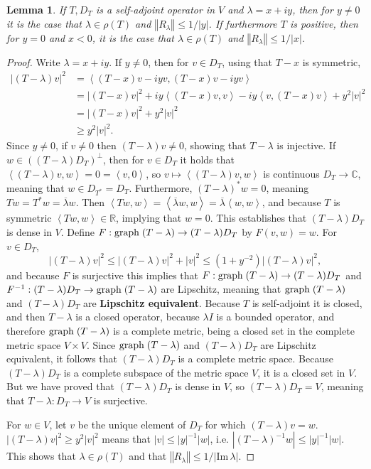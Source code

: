 \documentclass{article}
\newcommand{\inner}[2]{\left\langle #1, #2 \right\rangle}
\def\Im{\ensuremath{\mathrm{Im}}\,}
\newcommand{\graph}{\ensuremath\mathrm{graph}\;}
\newcommand{\norm}[1]{\left\Vert #1 \right\Vert}
\newtheorem{lemma}[theorem]{Lemma}
\theoremstyle{definition}
\begin{document}
\begin{lemma}
If $T,D_T$ is a  self-adjoint operator in $V$ and $\lambda=x+iy$, then
for $y \neq 0$ it is the case that
$\lambda \in \rho(T)$ and $\norm{R_\lambda} \leq 1/|y|$.
If furthermore $T$ is positive, then for $y=0$ and $x<0$, it is the case that
$\lambda \in \rho(T)$ and
 $\norm{R_\lambda} \leq 
1/|x|$.
\end{lemma}
\begin{proof}
Write $\lambda = x+iy$. If $y \neq 0$, then for $v \in D_T$, using that $T-x$ is symmetric,
\begin{align*}
|(T-\lambda)v|^2&=\inner{(T-x)v-iyv}{(T-x)v-iyv}\\
&=|(T-x)v|^2 +iy \inner{(T-x)v}{v} -iy \inner{v}{(T-x)v}+y^2 |v|^2\\
&=|(T-x)v|^2 +y^2 |v|^2\\
&\geq y^2 |v|^2.
\end{align*}
Since $y \neq 0$, if $v \neq 0$ then $(T-\lambda)v \neq 0$, showing that $T-\lambda$ is injective.
If $w \in ((T-\lambda)D_T)^\perp$, then
for $v \in D_T$ it holds that $\inner{(T-\lambda)v}{w}=0=\inner{v}{0}$, so
$v \mapsto \inner{(T-\lambda)v}{w}$ is continuous $D_T \to \mathbb{C}$, meaning
that $w \in D_{T^*}=D_T$. 
Furthermore, $(T-\lambda)^*w = 0$, meaning $Tw = T^*w = \overline{\lambda} w$.  
Then $\inner{Tw}{w} = \inner{\overline{\lambda}w}{w} = \overline{\lambda} \inner{w}{w}$,
and because $T$ is symmetric $\inner{Tw}{w} \in \mathbb{R}$, implying that $w=0$.
This establishes that $(T-\lambda)D_T$ is dense in $V$.
Define $F:\graph (T-\lambda) \to (T-\lambda)D_T$ by $F(v,w)=w$.
For $v \in D_T$,
\[
|(T-\lambda)v|^2 \leq |(T-\lambda)v|^2 + |v|^2 \leq (1+y^{-2})|(T-\lambda)v|^2,
\]
and because $F$ is surjective this implies that $F:\graph (T-\lambda) \to (T-\lambda)D_T$ 
and $F^{-1}:(T-\lambda)D_T \to \graph (T-\lambda)$ are Lipschitz, meaning that
$\graph (T-\lambda)$ and $(T-\lambda)D_T$ are \textbf{Lipschitz equivalent}.
Because $T$ is self-adjoint it is closed, and then $T-\lambda$ is a closed operator,
because $\lambda I$ is a bounded operator, and therefore $\graph (T-\lambda)$ is a complete metric,
being a closed set in the complete metric space $V \times V$. Since
$\graph (T-\lambda)$ and $(T-\lambda)D_T$ are Lipschitz equivalent,
it follows that $(T-\lambda)D_T$ is a complete metric space.
Because $(T-\lambda)D_T$ is a complete subspace of the metric space
$V$, it is a closed set in $V$. But we have proved that $(T-\lambda)D_T$ is dense in $V$,
so $(T-\lambda)D_T= V$, meaning that $T-\lambda:D_T \to V$ is surjective.

For $w \in V$, let $v$ be the unique element of $D_T$ for which
$(T-\lambda)v = w$. 
$|(T-\lambda)v|^2 \geq y^2 |v|^2$ means that
$|v| \leq |y|^{-1} |w|$, i.e.
 $|(T-\lambda)^{-1}w| \leq |y|^{-1} |w|$. This shows that $\lambda \in \rho(T)$ and that
$\norm{R_\lambda} \leq 1/|\Im \lambda|$.
\end{proof}
\end{document}
